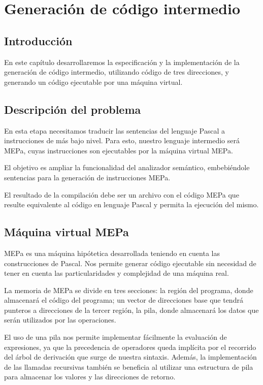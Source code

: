 \chapter{Generación de código intermedio}

\section{Introducción}
En este capítulo desarrollaremos la especificación y la implementación de la generación de código intermedio, utilizando código de tres direcciones, y generando un código ejecutable por una máquina virtual.

\section{Descripción del problema}
\label{sec:gen_cod:descr_prob}
En esta etapa necesitamos traducir las sentencias del lenguaje Pascal a instrucciones de más bajo nivel. Para esto, nuestro lenguaje intermedio será MEPa, cuyas instrucciones son ejecutables por la máquina virtual MEPa. 

El objetivo es ampliar la funcionalidad del analizador semántico, embebiéndole sentencias para la generación de instrucciones MEPa.

El resultado de la compilación debe ser un archivo con el código MEPa que resulte equivalente al código en lenguaje Pascal y permita la ejecución del mismo.

\section{Máquina virtual MEPa}
MEPa es una máquina hipótetica desarrollada teniendo en cuenta las construcciones de Pascal. Nos permite generar código ejecutable sin necesidad de tener en cuenta las particularidades y complejidad de una máquina real.

La memoria de MEPa se divide en tres secciones: la región del programa, donde almacenará el código del programa; un vector de direcciones base que tendrá punteros a direcciones de la tercer región, la pila, donde almacenará los datos que serán utilizados por las operaciones. 

El uso de una pila nos permite implementar fácilmente la evaluación de expresiones, ya que la precedencia de operadores queda implícita por el recorrido del árbol de derivación que surge de nuestra sintaxis. Además, la implementación de las llamadas recursivas también se beneficia al utilizar una estructura de pila para almacenar los valores y las direcciones de retorno.

